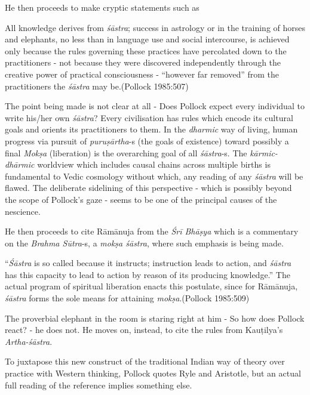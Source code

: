He then proceeds to make cryptic statements such as 
\begin{myquote}
All knowledge derives from {\sl śāstra}; success in astrology or in the training of horses and elephants, no less than in language use and social intercourse, is achieved only because the rules governing these practices have percolated down to the practitioners - not because they were discovered independently through the creative power of practical consciousness - ``however far removed'' from the practitioners the {\sl śāstra} may be.\hfill (Pollock 1985:507)
\end{myquote}

The point being made is not clear at all - Does Pollock expect every individual to write his/her own {\sl śāstra}? Every civilisation has rules which encode its cultural goals and orients its practitioners to them. In the {\sl dharmic} way of living, human progress via pursuit of {\sl puruṣārtha}-s (the goals of existence) toward possibly a final {\sl Mokṣa} (liberation) is the overarching goal of all {\sl śāstra}-s. The {\sl kārmic-dhārmic} worldview which includes causal chains across multiple births is fundamental to Vedic cosmology without which, any reading of any {\sl śāstra} will be flawed. The deliberate sidelining of this perspective - which is possibly beyond the scope of Pollock's gaze - seems to be one of the principal causes of the nescience.

He then proceeds to cite Rāmānuja from the {\sl Śrī Bhāṣya} which is a commentary on the {\sl Brahma Sūtra}-s, a {\sl mokṣa śāstra}, where such emphasis is being made.
\begin{myquote}
``{{\sl Śāstra}} is so called because it instructs; instruction leads to action, and {\sl śāstra} has this capacity to lead to action by reason of its producing knowledge.'' The actual program of spiritual liberation enacts this postulate, since for Rāmānuja, {\sl śāstra} forms the sole means for attaining {\sl mokṣa}.\hfill (Pollock 1985:509)
\end{myquote}

The proverbial elephant in the room is staring right at him - So how does Pollock react? - he does not. He moves on, instead, to cite the rules from Kauṭilya's {\sl Artha-śāstra}.

To juxtapose this new construct of the traditional Indian way of theory over practice with Western thinking, Pollock quotes Ryle and Aristotle, but an actual full reading of the reference implies something else.

